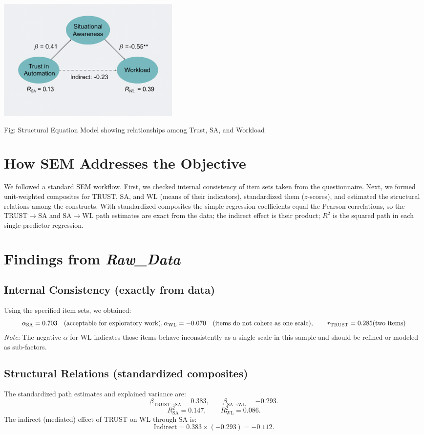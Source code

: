 \documentclass[conference]{IEEEtran}
\begin{document}
\includegraphics[width=0.40\textwidth]{SEM 101.png}

Fig: Structural Equation Model showing relationships among Trust, SA, and Workload



\section{How SEM Addresses the Objective}
We followed a standard SEM workflow. First, we checked internal consistency of item sets taken from the questionnaire. Next, we formed unit-weighted composites for TRUST, SA, and WL (means of their indicators), standardized them (\(z\)-scores), and estimated the structural relations among the constructs. With standardized composites the simple-regression coefficients equal the Pearson correlations, so the TRUST\(\rightarrow\)SA and SA\(\rightarrow\)WL path estimates are exact from the data; the indirect effect is their product; \(R^2\) is the squared path in each single-predictor regression.

\section{Findings from \textit{Raw\_Data}}

\subsection{Internal Consistency (exactly from data)}
Using the specified item sets, we obtained:
\[
\alpha_{\text{SA}} = 0.703 \quad (\text{acceptable for exploratory work}),\\
\alpha_{\text{WL}} = -0.070 \quad (\text{items do not cohere as one scale}),
\qquad
r_{\text{TRUST}} = 0.285 \ \\
(\text{two items})
\]
\textit{Note:} The negative \(\alpha\) for WL indicates those items behave inconsistently as a single scale in this sample and should be refined or modeled as sub-factors.

\subsection{Structural Relations (standardized composites)}
The standardized path estimates and explained variance are:
\[
\beta_{\text{TRUST}\rightarrow\text{SA}} = \mathbf{0.383}, \qquad
\beta_{\text{SA}\rightarrow\text{WL}} = \mathbf{-0.293}.
\]
\[
R^2_{\text{SA}} = \mathbf{0.147}, \qquad
R^2_{\text{WL}} = \mathbf{0.086}.
\]
The indirect (mediated) effect of TRUST on WL through SA is:
\[
\text{Indirect} = 0.383 \times (-0.293) = \mathbf{-0.112}.
\]
\end{document}
